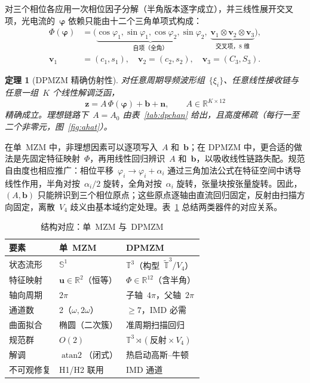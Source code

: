 \documentclass[11pt,journal,onecolumn]{IEEEtran}
\theoremstyle{plain}
\newtheorem{theorem}{定理}
\theoremstyle{remark}
\newcommand{\zv}{\mathbf{z}}
\newcommand{\uv}{\mathbf{u}}
\newcommand{\bv}{\mathbf{b}}
\newcommand{\nv}{\mathbf{n}}
\newcommand{\vv}{\mathbf{v}}
\newcommand{\phiv}{\bm{\varphi}}
\newcommand{\atan}{\operatorname{atan2}}
\begin{document}
对三个相位各应用一次相位因子分解（半角版本逐字成立），并三线性展开交叉项，光电流的~$\phiv$ 依赖只能由十二个三角单项式构成：
\begin{align}
\Phi(\phiv)&=\bigl(\underbrace{\cos\varphi_1,\sin\varphi_1,
\cos\varphi_2,\sin\varphi_2}_{\text{自项（全角）}},\;
\underbrace{\vv_1{\otimes}\vv_2{\otimes}\vv_3}_{\text{交叉项，8 维}}
\bigr),\nonumber\\
\vv_1&=(c_1,s_1),\quad \vv_2=(c_2,s_2),\quad \vv_3=(C_3,S_3).
\label{eq:feature}
\end{align}

\begin{theorem}[DPMZM 精确仿射性]
\label{th:dpmzm}
对任意周期导频波形组~$\{\xi_i\}$、任意线性接收链与任意一组~$K$ 个线性解调泛函，
\begin{equation}
\zv=A\,\Phi(\phiv)+\bv+\nv,\qquad A\in\mathbb{R}^{K\times 12}
\label{eq:dpaffine}
\end{equation}
精确成立。理想链路下~$A=A_0$ 由表~\ref{tab:dpchan} 给出，且高度稀疏（每行一至二个非零元，图~\ref{fig:ahat}）。
\end{theorem}

在单~MZM 中，非理想因素可以逐项写入~$A$ 和~$\bv$；在 DPMZM 中，更合适的做法是先固定特征映射~$\Phi$，再用线性回归辨识~$A$ 和~$\bv$，以吸收线性链路失配。规范自由度也相应推广：相位平移~$\varphi_i\to\varphi_i+\alpha_i$ 通过三角加法公式在特征空间中诱导线性作用，半角对按~$\alpha_i/2$ 旋转，全角对按~$\alpha_i$ 旋转，张量块按张量旋转。因此，$(A,\bv)$ 只能辨识到三个相位原点；这些原点逐轴由直流回归固定，反射由扫描方向固定，离散~$V_4$ 歧义由基本域约定处理。表~\ref{tab:struct} 总结两类器件的对应关系。

\begin{table}[!t]
\caption{结构对应：单~MZM 与~DPMZM}
\label{tab:struct}
\centering
\footnotesize
\setlength{\tabcolsep}{3pt}
\begin{tabular}{lll}
\toprule
要素 & 单~MZM & DPMZM\\
\midrule
状态流形 & $\mathbb{S}^1$ & $\mathbb{T}^3$（构型~$\widetilde{\mathbb{T}}^3/V_4$）\\
特征映射 & $\uv\in\mathbb{R}^2$（恒等） & $\Phi\in\mathbb{R}^{12}$（含半角）\\
轴向周期 & $2\pi$ & 子轴~$4\pi$，父轴~$2\pi$\\
通道数 & 2（$\omega,2\omega$） & $\ge 7$，IMD 必需\\
曲面拟合 & 椭圆（二次簇） & 准周期扫描回归\\
规范群 & $O(2)$ & $\mathbb{T}^3\rtimes(\text{反射}\times V_4)$\\
解调 & $\atan$（闭式） & 热启动高斯--牛顿\\
不可观修复 & H1/H2 联用 & IMD 通道\\
\bottomrule
\end{tabular}
\end{table}
\end{document}

